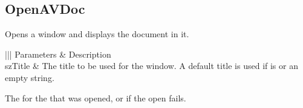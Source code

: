 \documentclass[letterpaper,12pt,english,openany,oneside]{sphinxmanual}
\begin{document}
\subsection{OpenAVDoc}
\label{\detokenize{IAC_API_OLE_Objects:openavdoc}}
Opens a window and displays the document in it.


\begin{sphinxVerbatim}[commandchars=\\\{\}]
  
\end{sphinxVerbatim}
\label{\detokenize{IAC_API_OLE_Objects:parameters-61}}


\begin{savenotes}\sphinxattablestart
\centering
{}\label{\detokenize{IAC_API_OLE_Objects:section-69}}\nobreak
\begin{tabular}[t]{|||}
\hline
\sphinxstyletheadfamily 
Parameters
&\sphinxstyletheadfamily 
Description
\\
\hline
szTitle
&
The title to be used for the window. A default title is used if  is  or an empty string.
\\
\hline
\end{tabular}
\par
\sphinxattableend\end{savenotes}


The  for the  that was opened, or  if the open fails.
\end{document}
